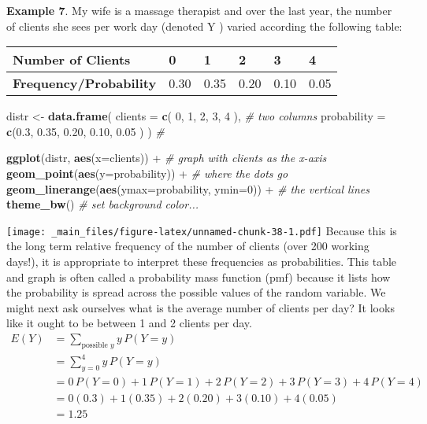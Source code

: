 \documentclass[]{book}
\newenvironment{Shaded}{\begin{snugshade}}{\end{snugshade}}
\newcommand{\KeywordTok}[1]{\textcolor[rgb]{0.13,0.29,0.53}{\textbf{{#1}}}}
\newcommand{\DataTypeTok}[1]{\textcolor[rgb]{0.13,0.29,0.53}{{#1}}}
\newcommand{\DecValTok}[1]{\textcolor[rgb]{0.00,0.00,0.81}{{#1}}}
\newcommand{\FloatTok}[1]{\textcolor[rgb]{0.00,0.00,0.81}{{#1}}}
\newcommand{\StringTok}[1]{\textcolor[rgb]{0.31,0.60,0.02}{{#1}}}
\newcommand{\CommentTok}[1]{\textcolor[rgb]{0.56,0.35,0.01}{\textit{{#1}}}}
\newcommand{\NormalTok}[1]{{#1}}
\begin{document}
\textbf{Example 7}. My wife is a massage therapist and over the last
year, the number of clients she sees per work day (denoted Y ) varied
according the following table:

\begin{longtable}[]{@{}llllll@{}}
\toprule
Number of Clients & 0 & 1 & 2 & 3 & 4\tabularnewline
\midrule
\endhead
\textbf{Frequency/Probability} & 0.30 & 0.35 & 0.20 & 0.10 &
0.05\tabularnewline
\bottomrule
\end{longtable}

\begin{Shaded}
\begin{Highlighting}[]
\NormalTok{distr <-}\StringTok{ }\KeywordTok{data.frame}\NormalTok{(    }\DataTypeTok{clients =} \KeywordTok{c}\NormalTok{( }\DecValTok{0}\NormalTok{,   }\DecValTok{1}\NormalTok{,    }\DecValTok{2}\NormalTok{,    }\DecValTok{3}\NormalTok{,    }\DecValTok{4}   \NormalTok{),    }\CommentTok{# two columns }
                    \DataTypeTok{probability =} \KeywordTok{c}\NormalTok{(}\FloatTok{0.3}\NormalTok{, }\FloatTok{0.35}\NormalTok{, }\FloatTok{0.20}\NormalTok{, }\FloatTok{0.10}\NormalTok{, }\FloatTok{0.05} \NormalTok{) )   }\CommentTok{# }

\KeywordTok{ggplot}\NormalTok{(distr, }\KeywordTok{aes}\NormalTok{(}\DataTypeTok{x=}\NormalTok{clients)) +}\StringTok{                   }\CommentTok{# graph with clients as the x-axis}
\StringTok{  }\KeywordTok{geom_point}\NormalTok{(}\KeywordTok{aes}\NormalTok{(}\DataTypeTok{y=}\NormalTok{probability)) +}\StringTok{                }\CommentTok{# where the dots go}
\StringTok{  }\KeywordTok{geom_linerange}\NormalTok{(}\KeywordTok{aes}\NormalTok{(}\DataTypeTok{ymax=}\NormalTok{probability, }\DataTypeTok{ymin=}\DecValTok{0}\NormalTok{)) +}\StringTok{ }\CommentTok{# the vertical lines       }
\StringTok{  }\KeywordTok{theme_bw}\NormalTok{()                                      }\CommentTok{# set background color...}
\end{Highlighting}
\end{Shaded}

\texttt{[image: \_main\_files/figure-latex/unnamed-chunk-38-1.pdf]}
Because this is the long term relative frequency of the number of
clients (over 200 working days!), it is appropriate to interpret these
frequencies as probabilities. This table and graph is often called a
probability mass function (pmf) because it lists how the probability is
spread across the possible values of the random variable. We might next
ask ourselves what is the average number of clients per day? It looks
like it ought to be between 1 and 2 clients per day.
\[\begin{aligned} E\left(Y\right)   
  &=    \sum_{\textrm{possible }y}y\,P\left(Y=y\right) \\
    &=  \sum_{y=0}^{4}y\,P\left(Y=y\right) \\
    &=  0\,P\left(Y=0\right)+1\,P\left(Y=1\right)+2\,P\left(Y=2\right)+3\,P\left(Y=3\right)+4\,P\left(Y=4\right) \\
    &=  0\left(0.3\right)+1\left(0.35\right)+2\left(0.20\right)+3\left(0.10\right)+4\left(0.05\right) \\
    &=  1.25 \end{aligned}\]
\end{document}
